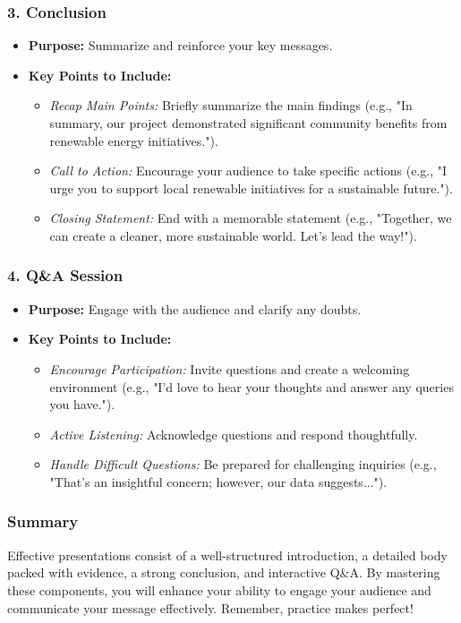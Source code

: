 \documentclass[aspectratio=169]{beamer}
\begin{document}
\begin{frame}[fragile]
    \frametitle{3. Conclusion}
    \begin{itemize}
        \item \textbf{Purpose:} Summarize and reinforce your key messages.
        \item \textbf{Key Points to Include:}
        \begin{itemize}
            \item \textit{Recap Main Points:} Briefly summarize the main findings (e.g., "In summary, our project demonstrated significant community benefits from renewable energy initiatives.").
            \item \textit{Call to Action:} Encourage your audience to take specific actions (e.g., "I urge you to support local renewable initiatives for a sustainable future.").
            \item \textit{Closing Statement:} End with a memorable statement (e.g., "Together, we can create a cleaner, more sustainable world. Let's lead the way!").
        \end{itemize}
    \end{itemize}
\end{frame}

\begin{frame}[fragile]
    \frametitle{4. Q\&A Session}
    \begin{itemize}
        \item \textbf{Purpose:} Engage with the audience and clarify any doubts.
        \item \textbf{Key Points to Include:}
        \begin{itemize}
            \item \textit{Encourage Participation:} Invite questions and create a welcoming environment (e.g., "I’d love to hear your thoughts and answer any queries you have.").
            \item \textit{Active Listening:} Acknowledge questions and respond thoughtfully.
            \item \textit{Handle Difficult Questions:} Be prepared for challenging inquiries (e.g., "That’s an insightful concern; however, our data suggests...").
        \end{itemize}
    \end{itemize}
\end{frame}

\begin{frame}[fragile]
    \frametitle{Summary}
    Effective presentations consist of a well-structured introduction, a detailed body packed with evidence, a strong conclusion, and interactive Q\&A. By mastering these components, you will enhance your ability to engage your audience and communicate your message effectively. Remember, practice makes perfect!
\end{frame}
\end{document}
